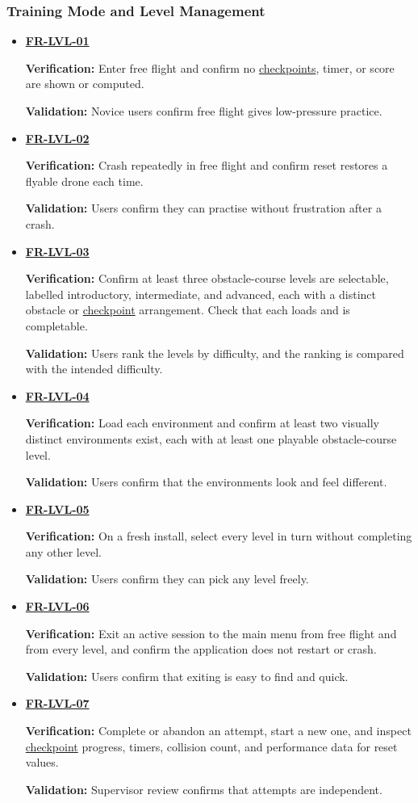 \documentclass[12pt]{article}
\begin{document}
\subsubsection{Training Mode and Level Management}
\begin{itemize}
\item \hyperlink{req:FR-LVL-01}{\textbf{FR-LVL-01}}\par
 \textbf{Verification:} Enter free flight and confirm no \hyperlink{glos:Checkpoint}{checkpoints},
 timer, or score are shown or computed.\par
 \textbf{Validation:} Novice users confirm free flight gives low-pressure practice.
\item \hyperlink{req:FR-LVL-02}{\textbf{FR-LVL-02}}\par
 \textbf{Verification:} Crash repeatedly in free flight and confirm reset
 restores a flyable drone each time.\par
 \textbf{Validation:} Users confirm they can practise without frustration after a crash.
\item \hyperlink{req:FR-LVL-03}{\textbf{FR-LVL-03}}\par
 \textbf{Verification:} Confirm at least three obstacle-course levels are
 selectable, labelled introductory, intermediate, and advanced, each with a
 distinct obstacle or \hyperlink{glos:Checkpoint}{checkpoint} arrangement. Check that each loads and is
 completable.\par
 \textbf{Validation:} Users rank the levels by difficulty, and the ranking is
 compared with the intended difficulty.
\item \hyperlink{req:FR-LVL-04}{\textbf{FR-LVL-04}}\par
 \textbf{Verification:} Load each environment and confirm at least two
 visually distinct environments exist, each with at least one playable
 obstacle-course level.\par
 \textbf{Validation:} Users confirm that the environments look and feel different.
\item \hyperlink{req:FR-LVL-05}{\textbf{FR-LVL-05}}\par
 \textbf{Verification:} On a fresh install, select every level in turn
 without completing any other level.\par
 \textbf{Validation:} Users confirm they can pick any level freely.
\item \hyperlink{req:FR-LVL-06}{\textbf{FR-LVL-06}}\par
 \textbf{Verification:} Exit an active session to the main menu from free
 flight and from every level, and confirm the application does not restart or crash.\par
 \textbf{Validation:} Users confirm that exiting is easy to find and quick.
\item \hyperlink{req:FR-LVL-07}{\textbf{FR-LVL-07}}\par
 \textbf{Verification:} Complete or abandon an attempt, start a new one, and
 inspect \hyperlink{glos:Checkpoint}{checkpoint} progress, timers, collision count, and performance data
 for reset values.\par
 \textbf{Validation:} Supervisor review confirms that attempts are independent.
\end{itemize}
\end{document}
